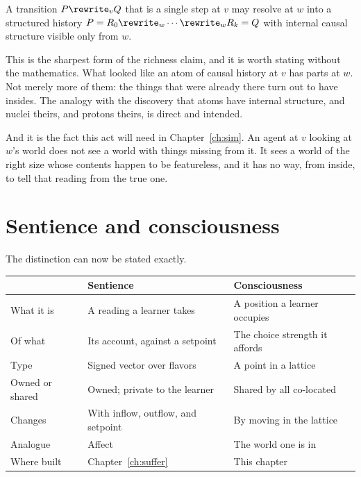 \begin{proposition}
\label{prop:resolution}
A transition $P \rewrite_v Q$ that is a single step at $v$ may resolve at
$w$ into a structured history
$P = R_0 \rewrite_w \cdots \rewrite_w R_k = Q$
with internal causal structure visible only from $w$.
\end{proposition}

\begin{remark}
\label{rmk:composite}
This is the sharpest form of the richness claim, and it is worth stating
without the mathematics.
What looked like an atom of causal history at $v$ has parts at $w$.
Not merely more of them: the things that were already there turn out to
have insides.
The analogy with the discovery that atoms have internal structure, and
nuclei theirs, and protons theirs, is direct and intended.

And it is the fact this act will need in Chapter~\ref{ch:sim}.
An agent at $v$ looking at $w$'s world does not see a world with things
missing from it.
It sees a world of the right size whose contents happen to be
featureless, and it has no way, from inside, to tell that reading from
the true one.
\end{remark}

\section{Sentience and consciousness}

The distinction can now be stated exactly.

\begin{center}
\renewcommand{\arraystretch}{1.4}
\small
\begin{tabular}{lll}
\toprule
& \textbf{Sentience} & \textbf{Consciousness} \\
\midrule
What it is & A reading a learner takes & A position a learner occupies \\
Of what & Its account, against a setpoint & The choice strength it affords \\
Type & Signed vector over flavors & A point in a lattice \\
Owned or shared & Owned; private to the learner & Shared by all co-located \\
Changes & With inflow, outflow, and setpoint & By moving in the lattice \\
Analogue & Affect & The world one is in \\
Where built & Chapter~\ref{ch:suffer} & This chapter \\
\bottomrule
\end{tabular}
\end{center}

